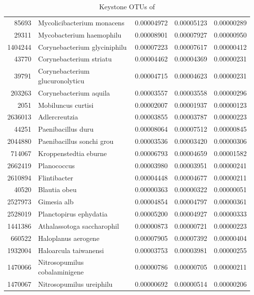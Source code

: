 \begin{table}[ht]
\begin{tabular}{rlrrr}
  85693 & Mycolicibacterium monacens & 0.00004972 & 0.00005123 & 0.00000289 \\ 
  29311 & Mycobacterium haemophilu & 0.00008901 & 0.00007927 & 0.00000950 \\ 
  1404244 & Corynebacterium glyciniphilu & 0.00007223 & 0.00007617 & 0.00000412 \\ 
  43770 & Corynebacterium striatu & 0.00004462 & 0.00004369 & 0.00000231 \\ 
  39791 & Corynebacterium glucuronolyticu & 0.00004715 & 0.00004623 & 0.00000231 \\ 
  203263 & Corynebacterium aquila & 0.00003557 & 0.00003558 & 0.00000296 \\ 
  2051 & Mobiluncus curtisi & 0.00002007 & 0.00001937 & 0.00000123 \\ 
  2636013 & Adlercreutzia & 0.00003855 & 0.00003787 & 0.00000223 \\ 
  44251 & Paenibacillus duru & 0.00008064 & 0.00007512 & 0.00000845 \\ 
  2044880 & Paenibacillus sonchi grou & 0.00003536 & 0.00003420 & 0.00000306 \\ 
  714067 & Kroppenstedtia eburne & 0.00006793 & 0.00004659 & 0.00001582 \\ 
  2662419 & Planococcus & 0.00003980 & 0.00003951 & 0.00000241 \\ 
  2610894 & Flintibacter & 0.00004448 & 0.00004677 & 0.00000211 \\ 
  40520 & Blautia obeu & 0.00000363 & 0.00000322 & 0.00000051 \\ 
  2527973 & Gimesia alb & 0.00004854 & 0.00004797 & 0.00000361 \\ 
  2528019 & Planctopirus ephydatia & 0.00005200 & 0.00004927 & 0.00000333 \\ 
  1441386 & Athalassotoga saccharophil & 0.00000873 & 0.00000721 & 0.00000223 \\ 
  660522 & Haloplanus aerogene & 0.00007905 & 0.00007392 & 0.00000404 \\ 
  1932004 & Haloarcula taiwanensi & 0.00003753 & 0.00003981 & 0.00000255 \\ 
  1470066 & Nitrosopumilus cobalaminigene & 0.00000786 & 0.00000705 & 0.00000211 \\ 
  1470067 & Nitrosopumilus ureiphilu & 0.00000692 & 0.00000514 & 0.00000206 \\ 
   \hline
\end{tabular}
\caption{Keystone OTUs of } 
\end{table}

